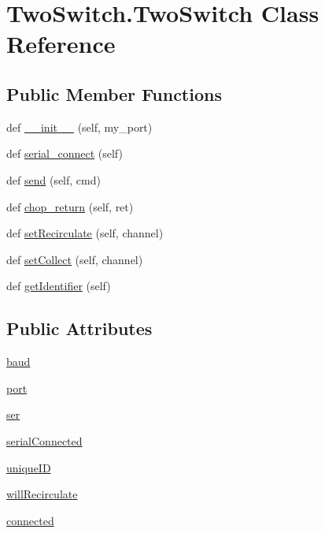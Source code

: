 \hypertarget{class_two_switch_1_1_two_switch}{}\section{Two\+Switch.\+Two\+Switch Class Reference}
\label{class_two_switch_1_1_two_switch}
\subsection*{Public Member Functions}
\begin{DoxyCompactItemize}
\item 
def \mbox{\hyperlink{class_two_switch_1_1_two_switch_a762f6622ca527b12104b0593378f87fb}{\+\_\+\+\_\+init\+\_\+\+\_\+}} (self, my\+\_\+port)
\item 
def \mbox{\hyperlink{class_two_switch_1_1_two_switch_ad816a09389ad0fb8ea56471aa4e8819f}{serial\+\_\+connect}} (self)
\item 
def \mbox{\hyperlink{class_two_switch_1_1_two_switch_a00b015b6f700f4d524056ff1c9de7c72}{send}} (self, cmd)
\item 
def \mbox{\hyperlink{class_two_switch_1_1_two_switch_a99d8b3d50bedbf126e1fbe10506e501f}{chop\+\_\+return}} (self, ret)
\item 
def \mbox{\hyperlink{class_two_switch_1_1_two_switch_a9c0f7d8f4a2af542cf574c11a9cee709}{set\+Recirculate}} (self, channel)
\item 
def \mbox{\hyperlink{class_two_switch_1_1_two_switch_a755481c98e9abd57c5307217df83795b}{set\+Collect}} (self, channel)
\item 
def \mbox{\hyperlink{class_two_switch_1_1_two_switch_ac5eb2e77087de5dc473a0722b16863a5}{get\+Identifier}} (self)
\end{DoxyCompactItemize}
\subsection*{Public Attributes}
\begin{DoxyCompactItemize}
\item 
\mbox{\hyperlink{class_two_switch_1_1_two_switch_a9fe7ee9555de6382e4be1419d7580203}{baud}}
\item 
\mbox{\hyperlink{class_two_switch_1_1_two_switch_a125dcd40f5242394787f7f5b1f3cfe71}{port}}
\item 
\mbox{\hyperlink{class_two_switch_1_1_two_switch_a8b0bb4497dcb4bdba19597fa296e698b}{ser}}
\item 
\mbox{\hyperlink{class_two_switch_1_1_two_switch_a06a3303adcbe39405325e87cd7d2bd8f}{serial\+Connected}}
\item 
\mbox{\hyperlink{class_two_switch_1_1_two_switch_a5facaddf7386248c105cedd41fb4812d}{unique\+ID}}
\item 
\mbox{\hyperlink{class_two_switch_1_1_two_switch_a31490d5047814007931a7b700d028a12}{will\+Recirculate}}
\item 
\mbox{\hyperlink{class_two_switch_1_1_two_switch_a643bdc6e214c03d08cba1b722be10e40}{connected}}
\end{DoxyCompactItemize}


